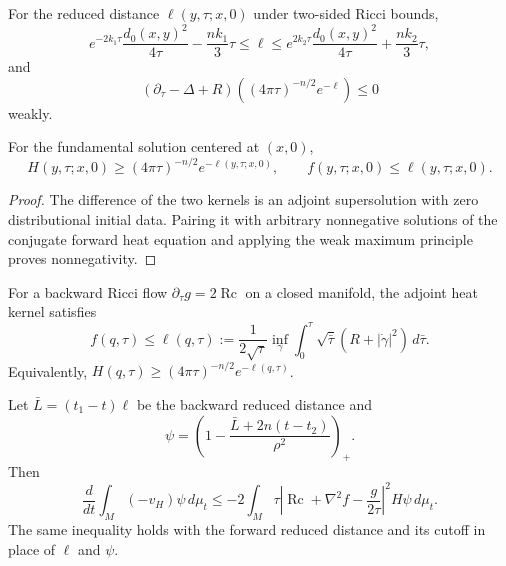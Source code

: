 \begin{lemma}
\label{lem:chow-ii-ch16-reduced-distance-subsolution}

For the reduced distance $\ell(y,\tau;x,0)$ under two-sided Ricci bounds,
\[
e^{-2k_1\tau}\frac{d_0(x,y)^2}{4\tau}-\frac{nk_1}{3}\tau
\le\ell\le e^{2k_2\tau}\frac{d_0(x,y)^2}{4\tau}+\frac{nk_2}{3}\tau,
\]
and
\[
\left(\partial_\tau-\Delta+R\right)
 \left((4\pi\tau)^{-n/2}e^{-\ell}\right)\le0
\]
weakly.
\end{lemma}

\begin{lemma}
\label{lem:chow-ii-ch16-adjoint-dominates-reduced}


For the fundamental solution centered at $(x,0)$,
\[
H(y,\tau;x,0)\ge(4\pi\tau)^{-n/2}e^{-\ell(y,\tau;x,0)},
\qquad f(y,\tau;x,0)\le\ell(y,\tau;x,0).
\]
\end{lemma}
\begin{proof}
\sketch The difference of the two kernels is an adjoint supersolution with zero
distributional initial data. Pairing it with arbitrary nonnegative solutions
of the conjugate forward heat equation and applying the weak maximum principle
proves nonnegativity.
\end{proof}

\begin{theorem}
\label{thm:chow-ii-ch16-reduced-distance-harnack}


For a backward Ricci flow $\partial_\tau g=2\operatorname{Rc}$ on a closed
manifold, the adjoint heat kernel satisfies
\[
f(q,\tau)\le\ell(q,\tau):=\frac1{2\sqrt\tau}
 \inf_\gamma\int_0^\tau\sqrt{\bar\tau}
 \left(R+|\dot\gamma|^2\right)\,d\bar\tau.
\]
Equivalently, $H(q,\tau)\ge(4\pi\tau)^{-n/2}e^{-\ell(q,\tau)}$.
\end{theorem}

\begin{theorem}
\label{thm:chow-ii-ch16-localized-perelman-entropy}


Let $\bar L=(t_1-t)\ell$ be the backward reduced distance and
\[
\psi=\left(1-\frac{\bar L+2n(t-t_2)}{\rho^2}\right)_+.
\]
Then
\[
\frac{d}{dt}\int_M(-v_H)\psi\,d\mu_t
\le-2\int_M\tau\left|\operatorname{Rc}+\nabla^2f-\frac{g}{2\tau}\right|^2H\psi\,d\mu_t.
\]
The same inequality holds with the forward reduced distance and its cutoff in
place of $\ell$ and $\psi$.
\end{theorem}
